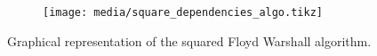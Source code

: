 \begin{figure}[htbp]
    \centering
    \centering
    \begin{subfigure}[t]{0.3\textwidth}
        \texttt{[image: media/square\_dependencies\_algo.tikz]}
        
    \end{subfigure}
    \caption{Graphical representation of the squared Floyd Warshall algorithm.}
        \label{fig:square-algo}
\end{figure}

\FloatBarrier